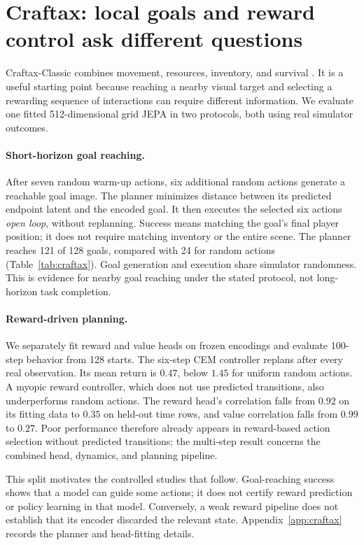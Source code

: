 \section{Craftax: local goals and reward control ask different questions}
\label{sec:craftax}

Craftax-Classic combines movement, resources, inventory, and survival
\citep{matthews2024craftax}. It is a useful starting point because reaching a nearby visual target
and selecting a rewarding sequence of interactions can require different information. We evaluate
one fitted 512-dimensional grid JEPA in two protocols, both using real simulator outcomes.

\paragraph{Short-horizon goal reaching.}
After seven random warm-up actions, six additional random actions generate a reachable goal image.
The planner minimizes distance between its predicted endpoint latent and the encoded goal. It then
executes the selected six actions \emph{open loop}, without replanning. Success means matching the
goal's final player position; it does not require matching inventory or the entire scene. The planner
reaches 121 of 128 goals, compared with 24 for random actions (Table~\ref{tab:craftax}). Goal generation
and execution share simulator randomness. This is evidence for nearby goal reaching under the stated
protocol, not long-horizon task completion.

\paragraph{Reward-driven planning.}
We separately fit reward and value heads on frozen encodings and evaluate 100-step behavior from
128 starts. The six-step CEM controller replans after every real observation. Its mean return is
$0.47$, below $1.45$ for uniform random actions. A myopic reward controller, which does not use
predicted transitions, also underperforms random actions. The reward head's correlation falls from
$0.92$ on its fitting data to $0.35$ on held-out time rows, and value correlation falls from $0.99$
to $0.27$. Poor performance therefore already appears in reward-based action selection without predicted
transitions; the multi-step result concerns the combined head, dynamics, and planning pipeline.

\begin{table}[t]
\centering
\caption{\textbf{Different tasks, one Craftax checkpoint.} Goal reaching uses 128 nearby goals and
six open-loop actions. Reward control uses 128 starts and 100 steps; $\pm$ is the standard deviation
across starts. These are exploratory single-model results, not the standard Craftax achievement
benchmark.}
\label{tab:craftax}
\end{table}

This split motivates the controlled studies that follow. Goal-reaching success shows that a model
can guide some actions; it does not certify reward prediction or policy learning in that model.
Conversely, a weak reward pipeline does not establish that its encoder discarded the relevant
state. Appendix~\ref{app:craftax} records the planner and head-fitting details.

